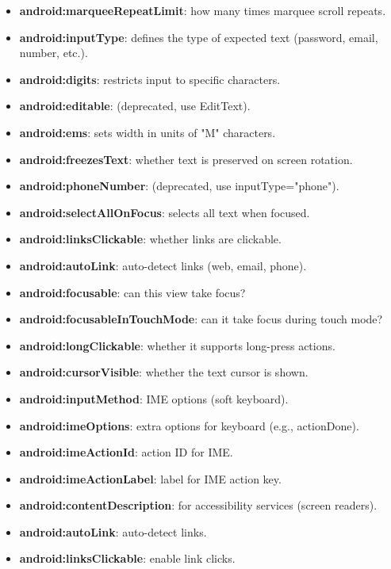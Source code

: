 \documentclass{report}
\begin{document}
\begin{itemize}
\begin{itemize}
                \item \textbf{android:marqueeRepeatLimit}: how many times marquee scroll repeats.
                \item \textbf{android:inputType}: defines the type of expected text (password, email, number, etc.).
                \item \textbf{android:digits}: restricts input to specific characters.
                \item \textbf{android:editable}: (deprecated, use EditText).
                \item \textbf{android:ems}: sets width in units of "M" characters.
                \item \textbf{android:freezesText}: whether text is preserved on screen rotation.
                \item \textbf{android:phoneNumber}: (deprecated, use inputType="phone").
                \item \textbf{android:selectAllOnFocus}: selects all text when focused.
                \item \textbf{android:linksClickable}: whether links are clickable.
                \item \textbf{android:autoLink}: auto-detect links (web, email, phone).
                \item \textbf{android:focusable}: can this view take focus?
                \item \textbf{android:focusableInTouchMode}: can it take focus during touch mode?
                \item \textbf{android:longClickable}: whether it supports long-press actions.
                \item \textbf{android:cursorVisible}: whether the text cursor is shown.
                \item \textbf{android:inputMethod}: IME options (soft keyboard).
                \item \textbf{android:imeOptions}: extra options for keyboard (e.g., actionDone).
                \item \textbf{android:imeActionId}: action ID for IME.
                \item \textbf{android:imeActionLabel}: label for IME action key.
                \item \textbf{android:contentDescription}: for accessibility services (screen readers).
                \item \textbf{android:autoLink}: auto-detect links.
                \item \textbf{android:linksClickable}: enable link clicks.

\end{itemize}
\end{itemize}
\end{document}
